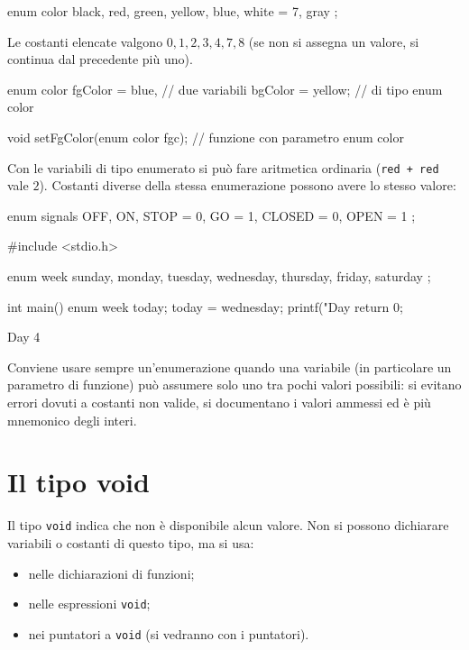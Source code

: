 \documentclass[11pt,a4paper]{article}
\begin{document}
\begin{esempio}
\begin{codice}
enum color { black, red, green, yellow, blue, white = 7, gray };
\end{codice}
Le costanti elencate valgono $0, 1, 2, 3, 4, 7, 8$ (se non si assegna un valore,
si continua dal precedente più uno).
\end{esempio}

\begin{codice}
enum color fgColor = blue,          // due variabili
           bgColor = yellow;        // di tipo enum color

void setFgColor(enum color fgc);    // funzione con parametro enum color
\end{codice}

Con le variabili di tipo enumerato si può fare aritmetica ordinaria
(\lstinline|red + red| vale $2$). Costanti diverse della stessa enumerazione
possono avere lo stesso valore:
\begin{codice}
enum signals { OFF, ON, STOP = 0, GO = 1, CLOSED = 0, OPEN = 1 };
\end{codice}

\begin{esempio}
\begin{codice}
#include <stdio.h>

enum week { sunday, monday, tuesday, wednesday, thursday, friday, saturday };

int main() {
    enum week today;
    today = wednesday;
    printf("Day %
    return 0;
}
\end{codice}
\begin{risultato}
Day 4
\end{risultato}
\end{esempio}

\begin{osservazione}
Conviene usare sempre un'enumerazione quando una variabile (in particolare un
parametro di funzione) può assumere solo uno tra pochi valori possibili: si evitano
errori dovuti a costanti non valide, si documentano i valori ammessi ed è più
mnemonico degli interi.
\end{osservazione}

\section{Il tipo void}

Il tipo \lstinline|void| indica che non è disponibile alcun valore. Non si possono
dichiarare variabili o costanti di questo tipo, ma si usa:
\begin{itemize}
    \item nelle dichiarazioni di funzioni;
    \item nelle espressioni \lstinline|void|;
    \item nei puntatori a \lstinline|void| (si vedranno con i puntatori).
\end{itemize}
\end{document}
